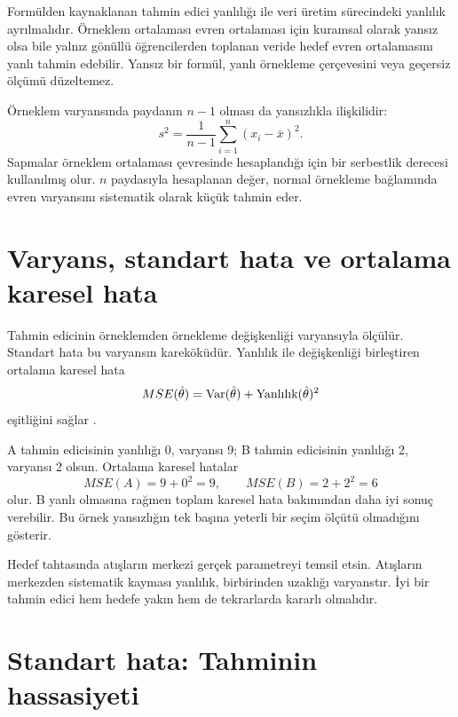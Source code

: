 Formülden kaynaklanan tahmin edici yanlılığı ile veri üretim sürecindeki
yanlılık ayrılmalıdır. Örneklem ortalaması evren ortalaması için kuramsal
olarak yansız olsa bile yalnız gönüllü öğrencilerden toplanan veride hedef
evren ortalamasını yanlı tahmin edebilir. Yansız bir formül, yanlı örnekleme
çerçevesini veya geçersiz ölçümü düzeltemez.

Örneklem varyansında paydanın $n-1$ olması da yansızlıkla ilişkilidir:
\[
s^2=\frac{1}{n-1}\sum_{i=1}^n(x_i-\bar x)^2.
\]
Sapmalar örneklem ortalaması çevresinde hesaplandığı için bir serbestlik
derecesi kullanılmış olur. $n$ paydasıyla hesaplanan değer, normal örnekleme
bağlamında evren varyansını sistematik olarak küçük tahmin eder.

\section{Varyans, standart hata ve ortalama karesel hata}

Tahmin edicinin örneklemden örnekleme değişkenliği varyansıyla ölçülür.
Standart hata bu varyansın kareköküdür. Yanlılık ile değişkenliği birleştiren
ortalama karesel hata
\[
MSE(\hat\theta)=\operatorname{Var}(\hat\theta)
+\text{Yanlılık}(\hat\theta)^2
\]
eşitliğini sağlar \cite{shao2003,wasserman2004}.

\begin{ornek}
A tahmin edicisinin yanlılığı 0, varyansı 9; B tahmin edicisinin yanlılığı 2,
varyansı 2 olsun. Ortalama karesel hatalar
\[
MSE(A)=9+0^2=9,
\qquad
MSE(B)=2+2^2=6
\]
olur. B yanlı olmasına rağmen toplam karesel hata bakımından daha iyi sonuç
verebilir. Bu örnek yansızlığın tek başına yeterli bir seçim ölçütü olmadığını
gösterir.
\end{ornek}

\begin{sezgibox}
Hedef tahtasında atışların merkezi gerçek parametreyi temsil etsin. Atışların
merkezden sistematik kayması yanlılık, birbirinden uzaklığı varyanstır. İyi bir
tahmin edici hem hedefe yakın hem de tekrarlarda kararlı olmalıdır.
\end{sezgibox}

\section{Standart hata: Tahminin hassasiyeti}

